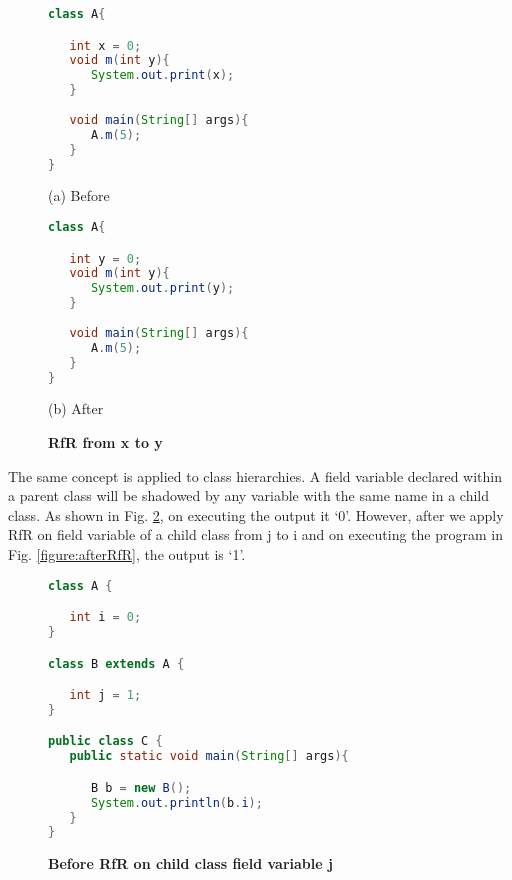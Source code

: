\begin{figure}[th]
\centering
\begin{minipage}[t]{0.45\linewidth}
\begin{lstlisting}[language=java, basicstyle=\scriptsize\ttfamily,frame=single]
class A{

   int x = 0;
   void m(int y){
      System.out.print(x);
   }
	
   void main(String[] args){
      A.m(5);
   }
}

\end{lstlisting}
\centering(a) Before
\end{minipage}
\hfill
\begin{minipage}[t]{0.45\linewidth}
\begin{lstlisting}[language=java, basicstyle=\scriptsize\ttfamily,frame=single]
class A{

   int y = 0;
   void m(int y){
      System.out.print(y);
   }
	
   void main(String[] args){
      A.m(5);
   }
}\end{lstlisting}
\centering(b) After
\end{minipage}
\caption{\textbf{RfR from x to y}}
\label{figure:sameBlock}
\end{figure}

The same concept is applied to class hierarchies. A field variable declared within a parent class will be shadowed by any variable with the same name in a child class. As shown in Fig. \ref{figure:beforeRfR}, on executing the output it `0'. However, after we apply RfR on field variable of a child class from j to i and on executing the program in Fig. \ref{figure:afterRfR}, the output is `1'. 

\begin{figure}[th]
\centering
\begin{minipage}[t]{0.75\linewidth}
\begin{lstlisting}[language=java, basicstyle=\scriptsize\ttfamily,frame=single]
class A {

   int i = 0;
}

class B extends A {

   int j = 1; 
}

public class C {
   public static void main(String[] args){

      B b = new B();
      System.out.println(b.i);
   }
}
\end{lstlisting}
\end{minipage}
\caption{\textbf{Before RfR on child class field variable j}}
\label{figure:beforeRfR}
\end{figure}

